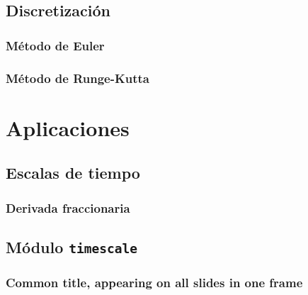 \documentclass[spanish, utf8,handout]{beamer} %
\theoremstyle{definition}
\begin{document}
\subsection{Discretización}
\subsubsection{Método de Euler}
\subsubsection{Método de Runge-Kutta}

\section{Aplicaciones}

\subsection{Escalas de tiempo}
\subsubsection{Derivada fraccionaria}
\subsection{Módulo \texttt{timescale}}

\begin{frame}
	\frametitle{Common title, appearing on all slides in one frame}
\end{frame}
\end{document}
